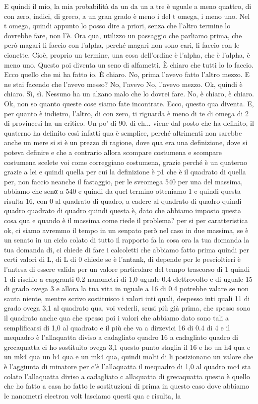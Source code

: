 \begin{soluzione}
{   E quindi il mio, la mia probabilità da un da un a tre è uguale a meno quattro, di con zero, indici, di greco, a un gran grado è meno i del t omega, i meno uno. Nel t omega, quindi appunto lo posso dire a priori, senza che l'altro termine lo dovrebbe fare, non l'è. Ora qua, utilizzo un passaggio che parliamo prima, che però magari li faccio con l'alpha, perché magari non sono cari, li faccio con le cionette. Cioè, proprio un termine, una cosa dell'ordine è l'alpha, che è l'alpha, è meno uno. Questo poi diventa un seno di alfametti. È chiaro che tutti lo lo faccio. Ecco quello che mi ha fatto io. È chiaro. No, prima l'avevo fatto l'altro mezzo. E ne stai facendo che l'avevo messo? No, l'avevo No, l'avevo mezzo. Ok, quindi è chiaro. Sì, sì. Nessuno ha un alzano malo che lo dovrei fare. No, è chiaro, è chiaro. Ok, non so quanto queste cose siamo fate incontrate. Ecco, questo qua diventa. E, per quanto è indietro, l'altro, di con zero, ti riguarda è meno di te di omega di 2 di provincesi ha un critico. Un po' di 90. di eh... viene dal posto che ha definito, il quaterno ha definito così infatti qua è semplice, perché altrimenti non sarebbe anche un mere si si è un prezzo di ragione, dove qua era una definizione, dove si poteva definire e che a contrario allora scompare costumena e scompare costumena scelete voi come correggiano costumena, grazie perché è un quaterno grazie a lei e quindi quella per cui la definizione è p1 che è il quadrato di quella per, non faccio neanche il fastaggio, per le sveomega 540 per una del massima, abbiamo che senα a 540 e quindi da quel termino otteniamo 1 e quindi questa risulta 16, con 0 al quadrato di quadro, a cadere al quadrato di quadro quindi quadro quadrato di quadro quindi questa è, dato che abbiamo imposto questa cosa qua e quando è il massima come riede il problema? per si per caratteristica ok, ci siamo avremmo il tempo in un senpato però nel caso in due massima, se è un senato in un ciclo colato di tutto il rapporto fa la cosa ora la tua domanda la tua domanda di, ci chiede di fare i calcoletti che abbiamo fatto prima quindi per certi valori di L, di L di 0 chiede se è l'antank, di depende per le pescioltieri è l'antesa di essere valida per un valore particolare del tempo trascorso di 1 quindi 1 di rischio a capgranti 0.2 nanometri di 1,0 uguale 0.4 elettrovolto e di uguale 15 di grado ovega 3 e allora la tua vita in uguale a 16 di 0.4 potrebbe valare se non sauta niente, mentre scrivo sostituisco i valori inti quali, despesso inti quali 11 di grado ovega 3,1 al quadrato qua, voi vederli, scusi più già prima, che spesso sono il quadrato anche qua che spesso poi i valori che abbiamo dato sono tali a semplificarsi di 1,0 al quadrato e il più che va a dirzevici 16 di 0.4 di 4 e il mequadro è l'allaquatta diviso a cadagliato quadro 16 a cadagliato quadro di grecaquatta ci ho sostituito ovega 3,1 questo punto staglia il 16 e ho un h4 qua e un mk4 qua un h4 qua e un mk4 qua, quindi molti di li posizionano un valore che è l'aggiunta di minatore per c'è l'allaquatta il mequadro di 1,0 al quadro mc4 sta colato l'allaquatta diviso a cadagliato c allaquatta di grecaquatta questo è quello che ho fatto a casa ho fatto le sostituzioni di prima in questo caso dove abbiamo le nanometri electron volt lasciamo questi qua e risulta, la }
\end{soluzione}
